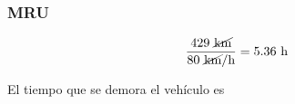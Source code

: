\documentclass{beamer}
\begin{document}
\begin{frame}
\frametitle{MRU}
% 

{\huge
\tmru
}


{\large
\begin{equation} 
\frac{429~\cancel{\text{km}}}{80~\cancel{\text{km}}/\text{h}}=
5.36~\text{h}
\end{equation}
}

 
El tiempo que se demora el veh\'iculo es

                                                             
\end{frame}

\end{document}
